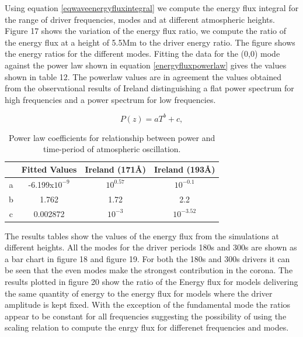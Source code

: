 \documentclass[authoryear,final,1p]{elsarticle}
\begin{document}
Using equation \eqref{eqwaveenergyfluxintegral} we compute the energy flux integral for the range of driver frequencies, modes and at different atmospheric heights. Figure 17
shows the variation of the energy flux ratio, we compute the ratio of the energy flux at a height of 5.5Mm to the driver energy ratio.  The figure shows the energy ratios for the different modes. Fitting  the  data for the (0,0) mode against the power law shown in equation \eqref{energyfluxpowerlaw} gives the values shown in table 12. The powerlaw values are in agreement the values obtained from the observational results of Ireland \citet{Ireland2014} distinguishing a flat power spectrum for high frequencies and a power spectrum for low frequencies.

\begin{equation}\label{energyfluxpowerlaw}
P(z)= aT^{b}+c ,
\end{equation}


\begin{table}
\centering
\begin{tabular}{c c c c }
\hline
   &  Fitted Values & Ireland (171{\AA}) & Ireland (193{\AA}) \\
\hline
a & -6.199x$10^{-9}$ &  $10^{0.57}$ & $10^{-0.1}$ \\
\hline
b & 1.762 & 1.72 & 2.2 \\
\hline
c & 0.002872 & $10^{-3}$ & $10^{-3.52}$ \\
\hline
\end{tabular} 
\caption{ Power law coefficients for relationship between power and time-period of atmospheric oscillation.}
\end{table}

The results tables show the values of the energy flux from the simulations at different heights. All the modes for the driver periods 180s and 300s are shown as a bar chart in figure 18 and figure 19. For both the 180s and 300s drivers it can be seen that the even modes make the strongest contribution in the corona. The results plotted in figure 20 show the ratio of the Energy flux for models delivering the same quantity of energy to the energy flux for models where the driver amplitude is kept fixed. With the exception of the fundamental mode the ratios appear to be constant for all frequencies suggesting the possibility of using the scaling relation to compute the enrgy flux for differenet frequencies and modes.  
\end{document}
